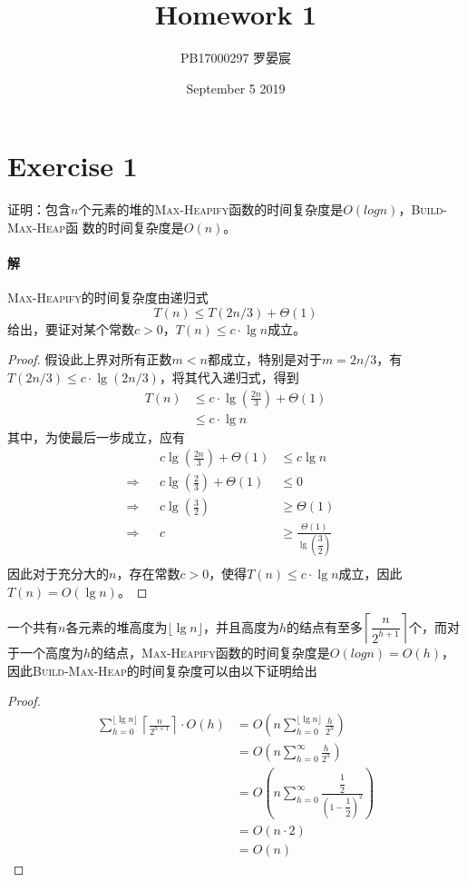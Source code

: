 \documentclass{article}
\title{Homework 1}
\author{PB17000297 罗晏宸}
\date{September 5 2019}
\begin{document}
\maketitle

\section{Exercise 1}
证明：包含$n$个元素的堆的\textsc{Max-Heapify}函数的时间复杂度是$O(logn)$，\textsc{Build-Max-Heap}函
数的时间复杂度是$O(n)$。
\\

\paragraph{解}
\textsc{Max-Heapify}的时间复杂度由递归式
\begin{equation*}
    T(n) \leq T(2n/3) + \Theta(1)
\end{equation*}
给出，要证对某个常数$c > 0$，$T(n) \leq c \cdot \lg{n}$成立。
\begin{proof}
假设此上界对所有正数$m < n$都成立，特别是对于$m =  2n/3$，有$T( 2n/3 ) \leq c \cdot \lg{(2n/3)}$，将其代入递归式，得到
\begin{align*}
    T(n) &\leq c \cdot \lg{\left(\frac{2n}{3}\right)} + \Theta(1) \\
    &\leq c \cdot \lg{n}
\end{align*}
其中，为使最后一步成立，应有
\begin{align*}
    && c \lg{\left(\frac{2n}{3}\right)} + \Theta(1) &\leq c \lg{n}& \\
    \Rightarrow && c \lg{\left( \frac{2}{3} \right)} + \Theta(1) &\leq 0 & \\
    \Rightarrow && c \lg{\left( \frac{3}{2} \right)} &\geq \Theta(1) & \\
    \Rightarrow && c &\geq \frac{\Theta(1)}{\lg{\left( \dfrac{3}{2} \right)}}& \\
\end{align*}
因此对于充分大的$n$，存在常数$c > 0$，使得$T(n) \leq c \cdot \lg{n}$成立，因此$T(n) = O(\lg{n})$。
\end{proof}
一个共有$n$各元素的堆高度为$\lfloor \lg{n} \rfloor$，并且高度为$h$的结点有至多$\left\lceil \dfrac{n}{2^{h+1}} \right\rceil$个，而对于一个高度为$h$的结点，\textsc{Max-Heapify}函数的时间复杂度是$O(logn)=O(h)$，因此\textsc{Build-Max-Heap}的时间复杂度可以由以下证明给出
\begin{proof}
\begin{align*}
    \sum_{h=0}^{\lfloor \lg{n} \rfloor}{\left\lceil \frac{n}{2^{h+1}} \right\rceil \cdot O(h)} &= O\left( n\sum_{h=0}^{\lfloor \lg{n} \rfloor}{\frac{h}{2^h}} \right) \\
    &= O\left( n\sum_{h=0}^{\infty}{\frac{h}{2^h}} \right) \\
    &= O\left( n\sum_{h=0}^{\infty}{\frac{\dfrac{1}{2}}{\left( 1 - \dfrac{1}{2} \right)^2}} \right) \\
    &= O(n \cdot 2) \\
    &= O(n)
\end{align*}
\end{proof}
\end{document}
